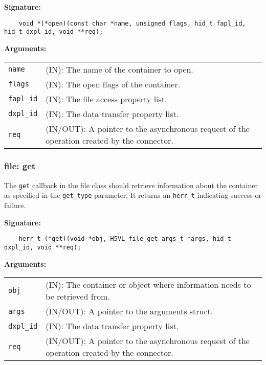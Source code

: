 \begin{mdframed}[style=bgbox] 
\textbf{Signature:}
\begin{lstlisting}
    void *(*open)(const char *name, unsigned flags, hid_t fapl_id, hid_t dxpl_id, void **req);
\end{lstlisting}

\textbf{Arguments:}\\
\begin{tabular}{l p{13.5cm}}
  \texttt{name} & (IN): The name of the container to open.\\
  \texttt{flags} & (IN): The open flags of the container.\\
  \texttt{fapl\_id} & (IN): The file access property list.\\
  \texttt{dxpl\_id} & (IN): The data transfer property list.\\
  \texttt{req} & (IN/OUT): A pointer to the asynchronous request of the
  operation created by the connector.\\
\end{tabular}
\end{mdframed}

\subsubsection{file: get}
The \texttt{get} callback in the file class should retrieve
information about the container as specified in the \texttt{get\_type}
parameter. It returns an \texttt{herr\_t} indicating success or failure.\bigskip

\begin{mdframed}[style=bgbox] 
\textbf{Signature:}
\begin{lstlisting}
    herr_t (*get)(void *obj, H5VL_file_get_args_t *args, hid_t dxpl_id, void **req);
\end{lstlisting}

\textbf{Arguments:}\\
\begin{tabular}{l p{13.5cm}}
  \texttt{obj} & (IN): The container or object where information needs to be
  retrieved from.\\
  \texttt{args} & (IN/OUT): A pointer to the arguments struct.\\
  \texttt{dxpl\_id} & (IN): The data transfer property list.\\
  \texttt{req} & (IN/OUT): A pointer to the asynchronous request of the
  operation created by the connector.\\
\end{tabular}
\end{mdframed}

